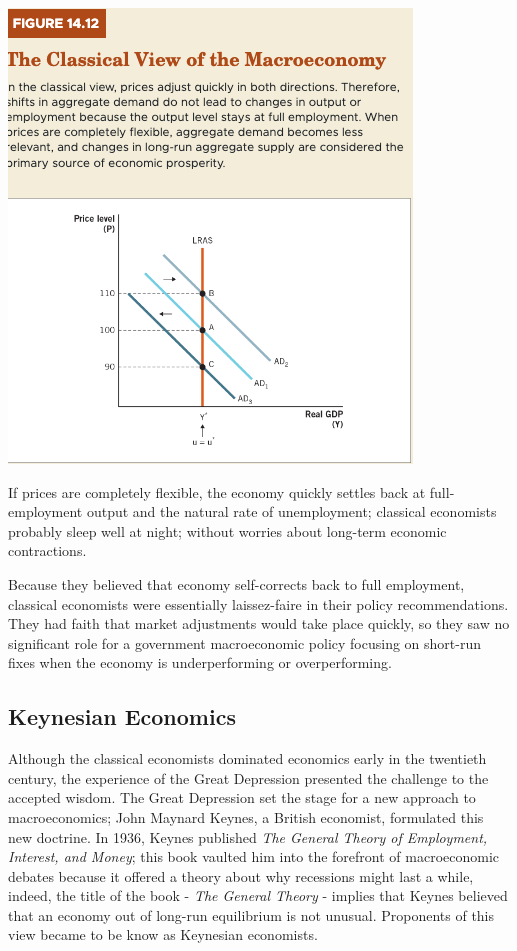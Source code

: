 \documentclass[11pt]{article} %
\begin{document}
\begin{center}
\includegraphics[scale=0.5]{images/Figure 14.12.png} 
\end{center}
If prices are completely flexible, the economy quickly settles back at full-employment output and the natural rate of unemployment; classical economists probably sleep well at night; without worries about long-term economic contractions.

Because they believed that economy self-corrects back to full employment, classical economists were essentially laissez-faire in their policy recommendations. They had faith that market adjustments would take place quickly, so they saw no significant role for a government macroeconomic policy focusing on short-run fixes when the economy is underperforming or overperforming.

\subsection*{Keynesian Economics}
Although the classical economists dominated economics early in the twentieth century, the experience of the Great Depression presented the challenge to the accepted wisdom. The Great Depression set the stage for a new approach to macroeconomics; John Maynard Keynes, a British economist, formulated this new doctrine. In 1936, Keynes published \textit{The General Theory of Employment, Interest, and Money}; this book vaulted him into the forefront of macroeconomic debates because it offered a theory about why recessions might last a while, indeed, the title of the book - \textit{The General Theory} - implies that Keynes believed that an economy out of long-run equilibrium is not unusual. Proponents of this view became to be know as Keynesian economists.
\end{document}
